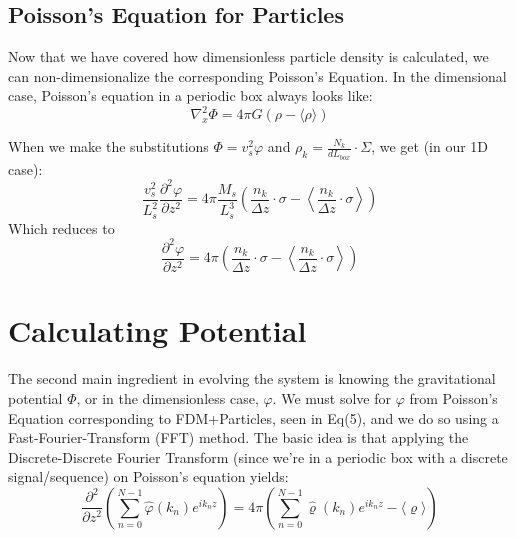 \documentclass{book}
\newcommand{\pd}{\partial}
\begin{document}
\subsection{Poisson's Equation for Particles}\label{Poisson's Equation for Particles}
Now that we have covered how dimensionless particle density is calculated, we can non-dimensionalize the corresponding Poisson's Equation. In the dimensional case, Poisson's equation in a periodic box always looks like:
\begin{equation*}
    \nabla_x^2 \Phi = 4\pi G (\rho - \langle \rho \rangle) 
\end{equation*}

When we make the substitutions $\Phi = v_s^2 \varphi$ and $\rho_k = \frac{N_k}{dL_{box}}\cdot \Sigma$, we get (in our 1D case):
\begin{equation*}
    \frac{v_s^2}{L_s^2}\frac{\pd^2 \varphi}{\pd z^2} = 4\pi \frac{M_s}{L_s^3} \left( \frac{n_k}{\Delta z}\cdot \sigma - \left\langle \frac{n_k}{\Delta z}\cdot \sigma \right\rangle\right)
\end{equation*}
Which reduces to
\begin{equation}
    \frac{\pd^2 \varphi}{\pd z^2} = 4\pi \left( \frac{n_k}{\Delta z}\cdot \sigma - \left\langle \frac{n_k}{\Delta z}\cdot \sigma \right\rangle\right)
\end{equation}

\section{Calculating Potential}
The second main ingredient in evolving the system is knowing the gravitational potential $\Phi$, or in the dimensionless case, $\varphi$. We must solve for $\varphi$ from Poisson's Equation corresponding to FDM+Particles, seen in Eq(5), and we do so using a Fast-Fourier-Transform (FFT) method. The basic idea is that applying the Discrete-Discrete Fourier Transform (since we're in a periodic box with a discrete signal/sequence) on Poisson's equation yields:
\begin{equation*}
    \frac{\pd^2}{\pd z^2}\left(\sum_{n=0}^{N-1} \hat{\varphi}(k_n) e^{i k_n z}\right) = 4 \pi \left(\sum_{n=0}^{N-1} \hat{\varrho}(k_n) e^{i k_n z} - \langle\varrho\rangle\right)
\end{equation*}
\end{document}
